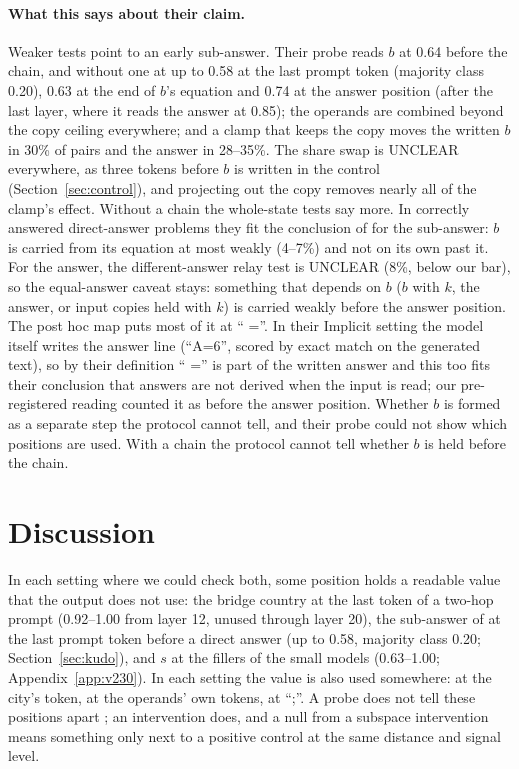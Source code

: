 \documentclass{article}
\begin{document}
\paragraph{What this says about their claim.} Weaker tests point to an early sub-answer. Their probe reads $b$ at 0.64 before the chain, and without one at up to 0.58 at the last prompt token (majority class 0.20), 0.63 at the end of $b$'s equation and 0.74 at the answer position (after the last layer, where it reads the answer at 0.85); the operands are combined beyond the copy ceiling everywhere; and a clamp that keeps the copy moves the written $b$ in 30\% of pairs and the answer in 28--35\%. The share swap is UNCLEAR everywhere, as three tokens before $b$ is written in the control (Section~\ref{sec:control}), and projecting out the copy removes nearly all of the clamp's effect. Without a chain the whole-state tests say more. In correctly answered direct-answer problems they fit the conclusion of \citet{kudo2026} for the sub-answer: $b$ is carried from its equation at most weakly (4--7\%) and not on its own past it. For the answer, the different-answer relay test is UNCLEAR (8\%, below our bar), so the equal-answer caveat stays: something that depends on $b$ ($b$ with $k$, the answer, or input copies held with $k$) is carried weakly before the answer position. The post hoc map puts most of it at `` =''. In their Implicit setting the model itself writes the answer line (``A=6'', scored by exact match on the generated text), so by their definition `` ='' is part of the written answer and this too fits their conclusion that answers are not derived when the input is read; our pre-registered reading counted it as before the answer position. Whether $b$ is formed as a separate step the protocol cannot tell, and their probe could not show which positions are used. With a chain the protocol cannot tell whether $b$ is held before the chain.

\section{Discussion}\label{sec:disc}

In each setting where we could check both, some position holds a readable value that the output does not use: the bridge country at the last token of a two-hop prompt (0.92--1.00 from layer 12, unused through layer 20), the sub-answer of \citet{kudo2026} at the last prompt token before a direct answer (up to 0.58, majority class 0.20; Section~\ref{sec:kudo}), and $s$ at the fillers of the small models (0.63--1.00; Appendix~\ref{app:v230}). In each setting the value is also used somewhere: at the city's token, at the operands' own tokens, at ``;''. A probe does not tell these positions apart \citep{ravichander2021probing,elazar2021amnesic}; an intervention does, and a null from a subspace intervention means something only next to a positive control at the same distance and signal level.
\end{document}
